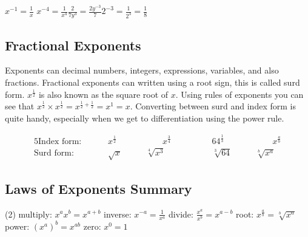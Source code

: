 \begin{tcolorbox}
	\hspace{1cm}$\displaystyle x^{-1}=\frac{1}{x}$ \hspace{2cm}$\displaystyle x^{-4}=\frac{1}{x^4}$\hspace{2cm}$\displaystyle\frac{2}{7y^3}=\frac{2y^{-3}}{7} $\hspace{2cm}$\displaystyle 2^{-3}=\frac{1}{2^3}=\frac{1}{8} $
\end{tcolorbox}	

\subsection*{Fractional Exponents}
Exponents can decimal numbers, integers, expressions, variables, and also fractions. Fractional exponents can written using a root sign, this is called surd form. $x^{\frac{1}{2}}$ is also known as the square root of $x$. Using rules of exponents you can see that $x^{\frac{1}{2}}\times x^{\frac{1}{2}}=x^{\frac{1}{2}+\frac{1}{2}}=x^1=x$. Converting between surd and index form is quite handy, especially when we get to differentiation using the power rule.
\begin{tcolorbox}\begin{alignat*}{5}
\textrm{Index form: }\qquad&x^{\frac{1}{2}}&\qquad\qquad x^{\frac{3}{4}} &\qquad\qquad 64^{\frac{1}{3}}&\qquad\qquad x^\frac{a}{b}\\
\textrm{Surd form: }\qquad&\sqrt{x}&\qquad \sqrt[4]{x^3}&\qquad\qquad\sqrt[3]{64}&\qquad \sqrt[b]{x^a}
\end{alignat*}\end{tcolorbox}

\subsection*{Laws of Exponents Summary}
\begin{tcolorbox}
\begin{tasks}[style=itemize](2)
	\task[] multiply: $ x^a x^b = x^{a+b}$
	\task[] inverse: $x^{-a}  =\frac{1}{x^a} $
	\task[] divide: $ \frac{x^a}{x^b}  =x^{a-b} $
	\task[] root: $ x^{\frac{a}{b}}  =\sqrt[b]{x^a}$
	\task[] power: $(x^a)^b  =x^{ab} $
	\task[] zero: $x^0  =1 $
\end{tasks}	
\end{tcolorbox}
	
